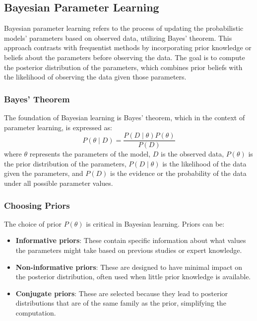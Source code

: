 \subsection{Bayesian Parameter Learning}
Bayesian parameter learning refers to the process of updating the probabilistic models' parameters based on observed data, utilizing Bayes' theorem. This approach contrasts with frequentist methods by incorporating prior knowledge or beliefs about the parameters before observing the data. The goal is to compute the posterior distribution of the parameters, which combines prior beliefs with the likelihood of observing the data given those parameters.

\subsubsection{Bayes' Theorem}
The foundation of Bayesian learning is Bayes' theorem, which in the context of parameter learning, is expressed as:
\[
P(\theta \mid D) = \frac{P(D \mid \theta) P(\theta)}{P(D)}
\]
where \( \theta \) represents the parameters of the model, \( D \) is the observed data, \( P(\theta) \) is the prior distribution of the parameters, \( P(D \mid \theta) \) is the likelihood of the data given the parameters, and \( P(D) \) is the evidence or the probability of the data under all possible parameter values.

\subsubsection{Choosing Priors}
The choice of prior \( P(\theta) \) is critical in Bayesian learning. Priors can be:
\begin{itemize}
    \item \textbf{Informative priors}: These contain specific information about what values the parameters might take based on previous studies or expert knowledge.
    \item \textbf{Non-informative priors}: These are designed to have minimal impact on the posterior distribution, often used when little prior knowledge is available.
    \item \textbf{Conjugate priors}: These are selected because they lead to posterior distributions that are of the same family as the prior, simplifying the computation.
\end{itemize}

